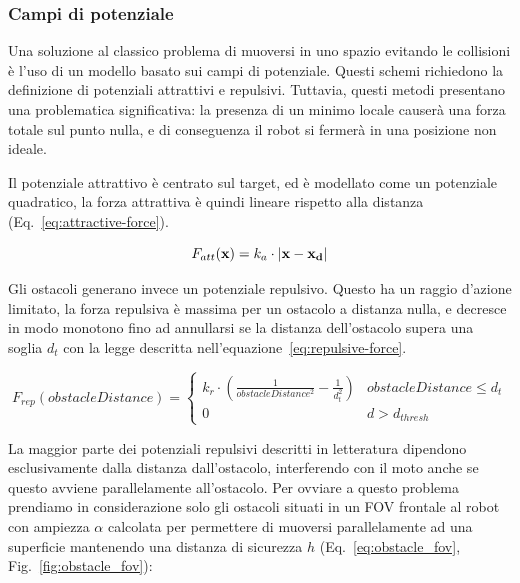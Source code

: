 \documentclass[a4paper]{article}
\begin{document}
	\subsubsection{Campi di potenziale}\label{subsec:Campi-di-potenziale}
	
	Una soluzione al classico problema di muoversi in uno spazio evitando le
	collisioni è l'uso di un modello basato sui campi di potenziale. Questi
	schemi richiedono la definizione di potenziali attrattivi e repulsivi.
	Tuttavia, questi metodi presentano una problematica significativa: la
	presenza di un minimo locale causerà una forza totale sul punto nulla, e di
	conseguenza il robot si fermerà in una posizione non ideale. 
	
	Il potenziale attrattivo è centrato sul target, ed è modellato come un
	potenziale quadratico, la forza attrattiva è quindi lineare rispetto alla
	distanza (Eq.~\ref{eq:attractive-force}).

	\begin{equation}\label{eq:attractive-force}
		F_{att}( \textbf{x}) = k_a\cdot \left| {\bf x - x_d} \right| 
	\end{equation}


	Gli ostacoli generano invece un potenziale repulsivo. Questo ha un raggio
	d'azione limitato, la forza repulsiva è massima per un ostacolo a distanza
	nulla, e decresce in modo monotono fino ad annullarsi se la distanza
	dell'ostacolo supera una soglia $d_t$ con la legge descritta
	nell'equazione~\ref{eq:repulsive-force}.

	\begin{equation}\label{eq:repulsive-force}
		F_{rep}(obstacleDistance) = \begin{cases}
			k_r \cdot \left(
				\frac{1}{obstacleDistance^2}-
				\frac{1}{d_t^2}
			\right)  & obstacleDistance \leq d_{t} \\
			0 & d > d_{thresh}
		\end{cases}
	\end{equation}

	\newpage
	La maggior parte dei potenziali repulsivi descritti in letteratura
	dipendono esclusivamente dalla distanza dall'ostacolo, interferendo con il
	moto anche se questo avviene parallelamente all'ostacolo. Per ovviare a
	questo problema prendiamo in considerazione solo gli ostacoli situati in un
	FOV frontale al robot con ampiezza $ \alpha  $ calcolata per permettere di
	muoversi parallelamente ad una superficie mantenendo una distanza di
	sicurezza $ h $ (Eq.~\ref{eq:obstacle_fov}, Fig.~\ref{fig:obstacle_fov}): 
\end{document}
